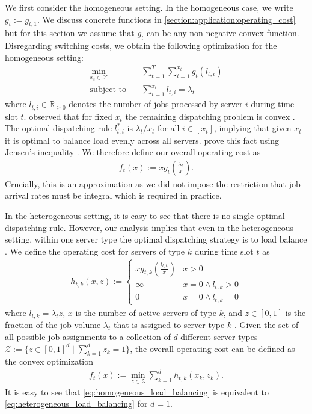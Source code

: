 We first consider the homogeneous setting. In the homogeneous case, we write $g_t := g_{t,1}$. We discuss concrete functions in \autoref{section:application:operating_cost} but for this section we assume that $g_t$ can be any non-negative convex function. Disregarding switching costs, we obtain the following optimization for the homogeneous setting: \begin{align*}
    \min_{x_t \in \mathcal{X}} \quad &\sum_{t=1}^T \sum_{i=1}^{x_t} g_t(l_{t,i}) \\
    \text{subject to}        \quad &\sum_{i=1}^{x_t} l_{t,i} = \lambda_t
\end{align*} where $l_{t,i} \in \mathbb{R}_{\geq 0}$ denotes the number of jobs processed by server $i$ during time slot $t$. \citeauthor*{Lin2011} observed that for fixed $x_t$ the remaining dispatching problem is convex \cite{Lin2011}. The optimal dispatching rule $l_{t,i}^*$ is $\lambda_t / x_t$ for all $i \in [x_t]$, implying that given $x_t$ it is optimal to balance load evenly across all servers. \citeauthor*{Albers2021_2} prove this fact using Jensen's inequality \cite{Albers2021_2}. We therefore define our overall operating cost as \begin{align}\label{eq:homogeneous_load_balancing}
    f_t(x) := x g_t\left(\frac{\lambda_t}{x}\right).
\end{align} Crucially, this is an approximation as we did not impose the restriction that job arrival rates must be integral which is required in practice.

In the heterogeneous setting, it is easy to see that there is no single optimal dispatching rule. However, our analysis implies that even in the heterogeneous setting, within one server type the optimal dispatching strategy is to load balance \cite{Albers2021_2}. We define the operating cost for servers of type $k$ during time slot $t$ as \begin{align}\label{eq:heterogeneous_load_balancing_unit}
    h_{t,k}(x,z) := \begin{cases}
        x g_{t,k}\left(\frac{l_{t,k}}{x}\right) & x > 0 \\
        \infty                                  & x = 0 \land l_{t,k} > 0 \\
        0                                       & x = 0 \land l_{t,k} = 0
    \end{cases}
\end{align} where $l_{t,k} = \lambda_t z$, $x$ is the number of active servers of type $k$, and $z \in [0,1]$ is the fraction of the job volume $\lambda_t$ that is assigned to server type $k$ \cite{Albers2021_2}. Given the set of all possible job assignments to a collection of $d$ different server types $\mathcal{Z} := \{z \in [0,1]^d \mid \sum_{k=1}^d z_k = 1\}$, the overall operating cost can be defined as the convex optimization \begin{align}\label{eq:heterogeneous_load_balancing}
    f_t(x) := \min_{z \in \mathcal{Z}} \sum_{k=1}^d h_{t,k}(x_k,z_k).
\end{align} It is easy to see that \autoref{eq:homogeneous_load_balancing} is equivalent to \autoref{eq:heterogeneous_load_balancing} for $d = 1$.

